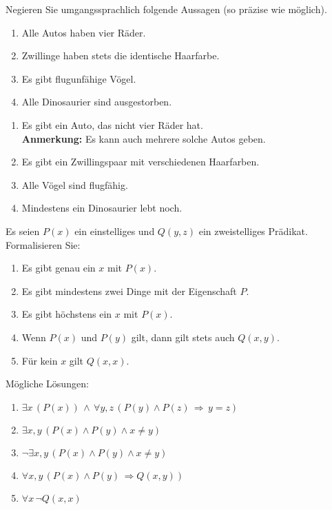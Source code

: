 \begin{example}
Negieren Sie umgangssprachlich folgende Aussagen (so präzise wie möglich).
\begin{enumerate}
\item Alle Autos haben vier Räder.
\item Zwillinge haben stets die identische Haarfarbe.
\item Es gibt flugunfähige Vögel.
\item Alle Dinosaurier sind ausgestorben.
\end{enumerate}
\tcblower
	\begin{enumerate}
	\item Es gibt ein Auto, das nicht vier Räder hat.
  \\ \textbf{Anmerkung:} Es kann auch mehrere solche Autos geben.
	\item Es gibt ein Zwillingspaar mit verschiedenen Haarfarben.
	\item Alle Vögel sind flugfähig.
	\item Mindestens ein Dinosaurier lebt noch.
	\end{enumerate}
\end{example}

\begin{example}
  Es seien $P(x)$ ein einstelliges und $Q(y,z)$ ein zweistelliges Prädikat. Formalisieren Sie:
  \begin{enumerate}
      \item Es gibt genau ein $x$ mit $P(x)$.
      \item Es gibt mindestens zwei Dinge mit der Eigenschaft $P$.
      \item Es gibt höchstens ein $x$ mit $P(x)$.
      \item Wenn $P(x)$ und $P(y)$ gilt, dann gilt stets auch $Q(x,y)$.
      \item Für kein $x$ gilt $Q(x,x)$.
    \end{enumerate}
      \tcblower
      Mögliche Lösungen:
      \begin{enumerate}
        \item $\exists x\,(P(x))\,\land\, \forall y,z\, (P(y)\land P(z)\,\Rightarrow\, y=z)$
        \item $\exists x,y\,(P(x)\land P(y)\land x\neq y)$
        \item $\neg \exists x,y\,(P(x)\land P(y)\land x\neq y)$
        \item $\forall x,y\,(P(x)\land P(y)\,\Rightarrow Q(x,y))$
        \item $\forall x\,\neg Q(x,x)$
      \end{enumerate}
  \end{example}

